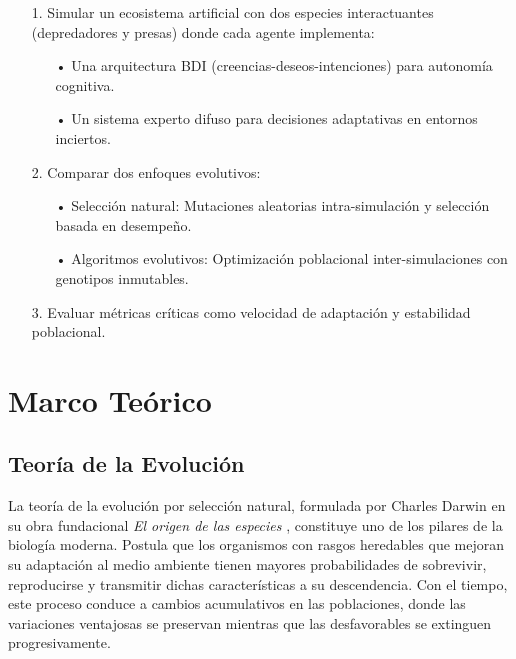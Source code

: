 \documentclass[letterpaper, 12pt]{report}
\begin{document}
\begin{itemize}


\item[1.] Simular un ecosistema artificial con dos especies interactuantes (depredadores y presas) donde cada agente implementa:

\begin{itemize}

\item[•] Una arquitectura BDI (creencias-deseos-intenciones) para autonomía cognitiva.

\item[•] Un sistema experto difuso para decisiones adaptativas en entornos inciertos.
        
\end{itemize}

\item[2.]    Comparar dos enfoques evolutivos:

\begin{itemize}


   \item[•]     Selección natural: Mutaciones aleatorias intra-simulación y selección basada en desempeño.

     \item[•]   Algoritmos evolutivos: Optimización poblacional inter-simulaciones con genotipos inmutables.

\end{itemize}

\item[3.] Evaluar métricas críticas como velocidad de adaptación y estabilidad poblacional. 
        
\end{itemize}


\chapter{Marco Teórico}

\section{Teoría de la Evolución}

La teoría de la evolución por selección natural, formulada por Charles Darwin en su obra fundacional \textit{El origen de las especies} \cite{darwin2004origin}, constituye uno de los pilares de la biología moderna. Postula que los organismos con rasgos heredables que mejoran su adaptación al medio ambiente tienen mayores probabilidades de sobrevivir, reproducirse y transmitir dichas características a su descendencia. Con el tiempo, este proceso conduce a cambios acumulativos en las poblaciones, donde las variaciones ventajosas se preservan mientras que las desfavorables se extinguen progresivamente. \\
\end{document}
